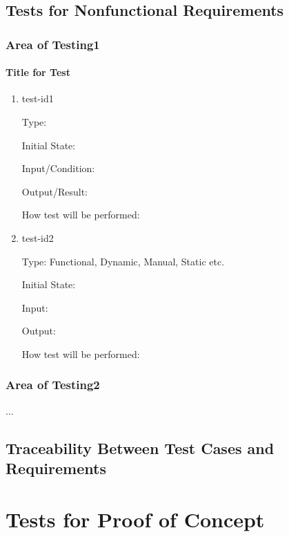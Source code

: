 \documentclass[12pt, titlepage]{article}
\begin{document}
\subsection{Tests for Nonfunctional Requirements}

\subsubsection{Area of Testing1}
		
\paragraph{Title for Test}

\begin{enumerate}

\item{test-id1\\}

Type: 
					
Initial State: 
					
Input/Condition: 
					
Output/Result: 
					
How test will be performed: 
					
\item{test-id2\\}

Type: Functional, Dynamic, Manual, Static etc.
					
Initial State: 
					
Input: 
					
Output: 
					
How test will be performed: 

\end{enumerate}

\subsubsection{Area of Testing2}

...

\subsection{Traceability Between Test Cases and Requirements}

\section{Tests for Proof of Concept}
\end{document}
